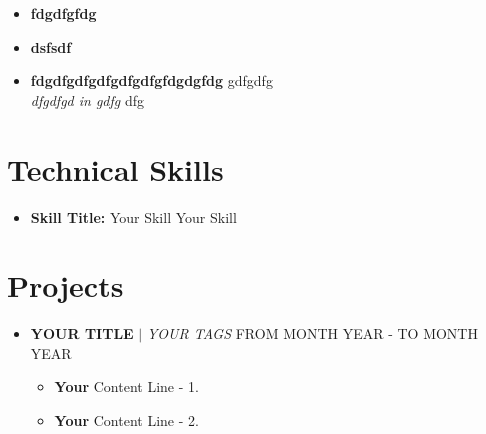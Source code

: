 \documentclass[letterpaper,5pt]{article}
\begin{document}
        \begin{itemize}[leftmargin=0.15in, label={}]
        \item[]
          \textbf{ fdgdfgfdg } \hfill  \\
          \textit{    } \hfill  
        \end{itemize}
        \vspace{-15pt}
      
        \begin{itemize}[leftmargin=0.15in, label={}]
        \item[]
          \textbf{ dsfsdf } \hfill  \\
          \textit{    } \hfill  
        \end{itemize}
        \vspace{-15pt}
      
        \begin{itemize}[leftmargin=0.15in, label={}]
        \item[]
          \textbf{ fdgdfgdfgdfgdfgdfgfdgdgfdg } \hfill gdfgdfg \\
          \textit{ dfgdfgd in gdfg } \hfill dfg 
        \end{itemize}
        \vspace{-15pt}
      
      \vspace{10mm}
    
    \vspace*{-10.5mm}  

    
    \section{Technical Skills}
    
        \begin{itemize}[leftmargin=0.15in,label={}]
        \item{
          \textbf{Skill Title: }{\textbullet{} Your Skill \textbullet{} Your Skill \newline}
        }
        \end{itemize}
        \vspace*{-6mm}  
        
    
    \section{Projects}
    
        \begin{itemize}[leftmargin=0.15in,label={}]
          \item{
            \textbf{YOUR TITLE} $|$ \emph{YOUR TAGS}
          }
          \hfill FROM MONTH YEAR - TO MONTH YEAR
          \begin{itemize} 
            \item[\textbullet{}]\textbf{Your} Content Line - 1.
            \item[\textbullet{}]\textbf{Your} Content Line - 2.
          \end{itemize}
          \end{itemize}

        


    
      
    
    
    
    
      
\end{document}
